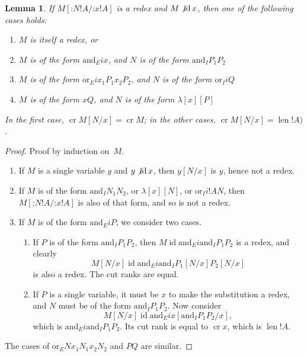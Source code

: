\documentclass[10pt,a4paper]{article}
\theoremstyle{plain}
\newtheorem{lem}[thm]{Lemma}
\theoremstyle{definition}
\theoremstyle{remark}
\newcommand*{\ollabel}[1]{\label{#1}}
\providecommand{\Subst}[3]{#1[#2/#3]}
\providecommand{\lambd}{\ensuremath{\lambda}}
\providecommand{\ande}{\mathrm{and}_E}
\providecommand{\andi}{\mathrm{and}_I}
\providecommand{\ore}{\mathrm{or}_E}
\providecommand{\ori}{\mathrm{or}_I}
\providecommand{\typeof}{\mathord{:}}
\providecommand{\len}{\operatorname{len}}
\providecommand{\ident}{\operatorname{id}}
\providecommand{\cutrank}{\operatorname{cr}}
\providecommand{\cutrank}{\operatorname{cr}}
\begin{document}
\begin{lem}\ollabel{lem:subst}
  If $\Subst{M}{\typeof{N}{!A}}{\typeof{x}{!A}}$ is a redex and $M
  \not\ident x$, then one of the following cases holds:
  \begin{enumerate}
  \item $M$ is itself a redex, or
  \item $M$ is of the form $\ande{i}{x}$, and $N$ is of the form
    $\andi{P_1}{P_2}$
  \item $M$ is of the form $\ore{i}{x_1}{P_1}{x_2}{P_2}$, and $N$ is
    of the form $\ori{i}{}{Q}$
  \item $M$ is of the form $x Q$, and $N$ is of the form
    $\lambd[x][P]$
  \end{enumerate}
  In the first case, $\cutrank{\Subst{M}{N}{x}} = \cutrank{M}$; in the
  other cases, $\cutrank{\Subst{M}{N}{x}} = \len{!A})$.
\end{lem}
\begin{proof}
  Proof by induction on~$M$.
  \begin{enumerate}
  \item If $M$ is a single variable $y$ and $y \not\ident x$, then
    $\Subst{y}{N}{x}$ is $y$, hence not a redex.
  \item If $M$ is of the form $\andi{N_1}{N_2}$, or $\lambd[x][N]$, or
    $\ori{i}{!A}{N}$, then $\Subst{M}{\typeof{N}{!A}}{\typeof{x}{!A}}$ is
    also of that form, and so is not a redex.
  \item If $M$ is of the form $\ande{i}{P}$, we consider two cases.
    \begin{enumerate}
      \item If $P$ is of the form $\andi{P_1}{P_2}$, then $M \ident
        \ande{i}{\andi{P_1}{P_2}}$ is a redex, and clearly
        \[
        \Subst{M}{N}{x} \ident
        \ande{i}{\andi{\Subst{P_1}{N}{x}}{\Subst{P_2}{N}{x}}}
        \]
        is also a redex. The cut ranks are equal.
      \item If $P$ is a single variable, it must be $x$ to make the
        substitution a redex, and $N$ must be of the form
        $\andi{P_1}{P_2}$. Now consider
        \[
        \Subst{M}{N}{x} \ident \Subst{\ande{i}{x}}{\andi{P_1}{P_2}}{x},
        \]
        which is $\ande{i}{\andi{P_1}{P_2}}$. Its cut rank is equal to
        $\cutrank{x}$, which is $\len{!A}$.
    \end{enumerate}
  \end{enumerate}
  The cases of $\ore{N}{x_1}{N_1}{x_2}{N_2}$ and $P Q$ are similar.
\end{proof}
\end{document}
